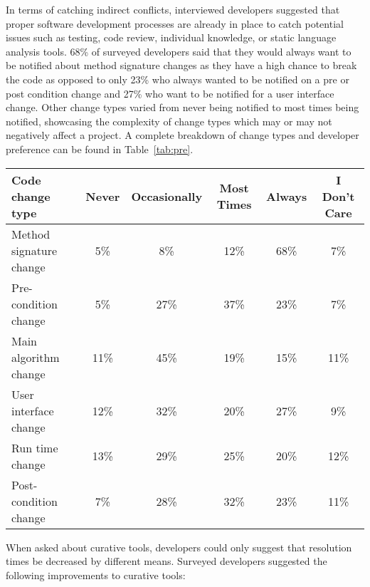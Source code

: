 In terms of catching indirect conflicts, interviewed developers suggested that proper software development processes 
are already in place to catch potential issues such as testing, code review, 
individual knowledge, or static language analysis tools. 68\% of surveyed developers said that they would always
want to be notified about method signature changes as they have a high chance to break the code as opposed to only
23\% who always wanted to be notified on a pre or post condition change and 27\% who want to be notified for a user
interface change. Other change types varied from never being notified to most times being notified, showcasing the
complexity of change types which may or may not negatively affect a project. A complete breakdown of change types and
developer preference can be found in Table~\ref{tab:pre}.

\begin{table*}[h]
\begin{center}
\begin{tabular}{| p{3cm} | c | c | c | c | c |}
\hline
Code change type &Never  & Occasionally & Most Times & Always & I Don't Care \\
\hline
\hline
Method signature change & 5\% & 8\% & 12\% & 68\% & 7\% \\ \hline
Pre-condition change & 5\% & 27\% & 37\% & 23\% & 7\% \\ \hline
Main algorithm change & 11\% & 45\% & 19\% & 15\% & 11\% \\ \hline
User interface change & 12\% & 32\% & 20\% & 27\% & 9\% \\ \hline
Run time change & 13\% & 29\% & 25\% & 20\% & 12\% \\ \hline
Post-condition change & 7\% & 28\% & 32\% & 23\% & 11\% \\ \hline
\end{tabular}
\end{center}
\caption{Results of survey questions to source code changes that developers deem notification worthy, in terms of percentage
of developers surveyed.\label{tab:pre}}
\end{table*}

When asked about curative tools, developers could only suggest that resolution times be decreased by different means.
Surveyed developers suggested the following improvements to curative tools: 

